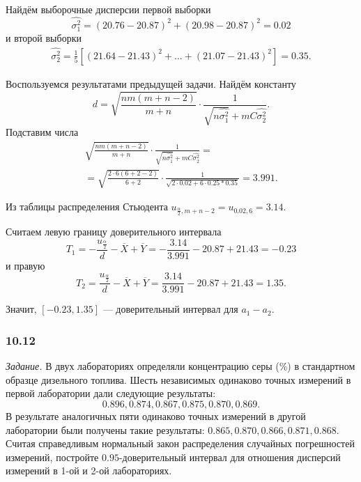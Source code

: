 Найдём выборочные дисперсии первой выборки
$$ \hat{ \sigma_1^2} =
  \left( 20.76 - 20.87 \right)^2 + \left( 20.98 - 20.87 \right)^2 =
  0.02$$
и второй выборки
\begin{equation*}
  \begin{split}
    \hat{ \sigma_2^2} =
    \frac{1}{5} \left[
      \left(21.64 - 21.43 \right)^2 + \dotsc + \left(21.07 - 21.43 \right)^2
    \right] =
    0.35.
  \end{split}
\end{equation*}

Воспользуемся результатами предыдущей задачи.
Найдём константу
$$d =
  \sqrt{ \frac{nm \left( m + n - 2 \right) }{m + n}} \cdot
  \frac{1}{ \sqrt{n \hat{ \sigma_1^2}} + mC \hat{ \sigma_2^2}}.$$
Подставим числа
\begin{equation*}
  \begin{split}
    \sqrt{ \frac{nm \left( m + n - 2 \right) }{m + n}} \cdot
    \frac{1}{ \sqrt{n \hat{ \sigma_1^2}} + mC \hat{ \sigma_2^2}} = \\
    = \sqrt{ \frac{2 \cdot 6 \left( 6 + 2 - 2 \right) }{6 + 2}} \cdot
    \frac{1}{ \sqrt{2 \cdot 0.02 + 6 \cdot 0.25 * 0.35}} =
    3.991.
  \end{split}
\end{equation*}

Из таблицы распределения Стьюдента $u_{ \frac{ \alpha }{2}, m + n - 2} = u_{0.02, 6} = 3.14$.

Считаем левую границу доверительного интервала
$$T_1 =
  - \frac{u_{ \frac{ \alpha }{2}}}{d} - \overline{X} + \overline{Y} =
  - \frac{3.14}{3.991} - 20.87 + 21.43 =
  -0.23$$
и правую
$$T_2 =
  \frac{u_{ \frac{ \alpha }{2}}}{d} - \overline{X} + \overline{Y} =
  \frac{3.14}{3.991} - 20.87 + 21.43 =
  1.35.$$

Значит, $ \left[ -0.23, 1.35 \right] $ --- доверительный интервал для $a_1 - a_2$.

\subsubsection*{10.12}

\textit{Задание.}
В двух лабораториях определяли концентрацию серы (\%) в стандартном образце дизельного топлива.
Шесть независимых одинаково точных измерений в первой лаборатории дали следующие результаты:
$$0.896, 0.874, 0.867, 0.875, 0.870, 0.869.$$
В результате аналогичных пяти одинаково точных
измерений в другой лаборатории были получены такие результаты: $0.865, 0.870, 0.866, 0.871, 0.868$.
Считая справедливым нормальный закон распределения случайных погрешностей измерений,
постройте $0.95$-доверительный интервал для отношения дисперсий измерений в 1-ой и 2-ой
лабораториях.

